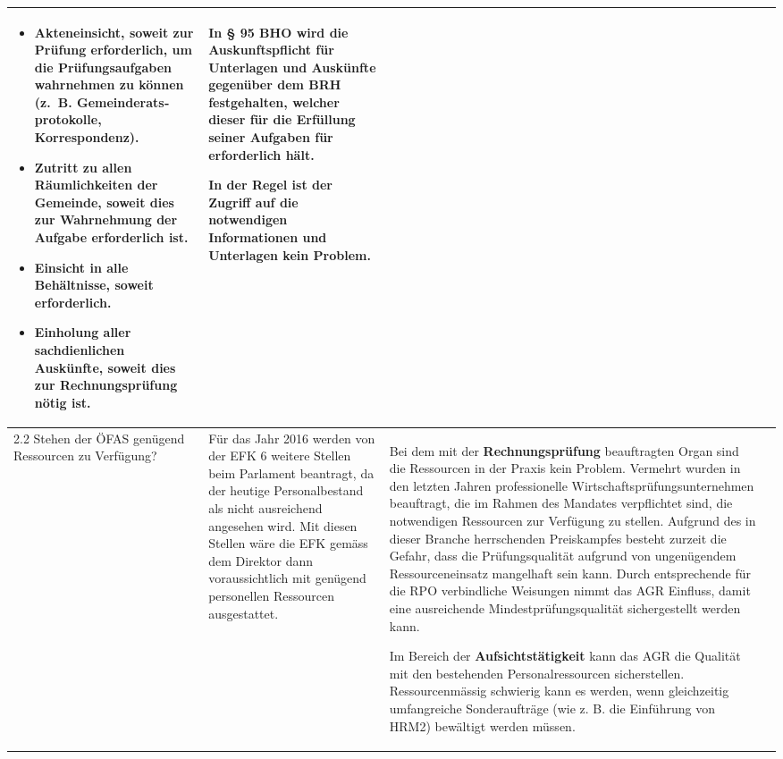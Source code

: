 \documentclass[10pt]{article}
\begin{document}
\begin{landscape}
\begin{center}
\begin{longtable}{|p{4cm}|p{5cm}|p{7.5cm}|p{7.5cm}|}
\begin{itemize}
    \item Akteneinsicht, soweit zur Prüfung erforderlich, um die Prüfungs­auf­gaben wahrnehmen zu können (z.~B. Gemeinderats­proto­kolle, Korrespondenz).

    \item Zutritt zu allen Räumlichkeiten der Gemeinde, soweit dies zur Wahrnehmung der Aufgabe erforderlich ist.

    \item Einsicht in alle Behältnisse, soweit erforderlich.

    \item Einholung aller sachdienlichen Auskünfte, soweit dies zur Rechnungsprüfung nötig ist.

\end{itemize}

 & In § 95 BHO wird die Auskunfts­pflicht für Unterlagen und Aus­künfte gegenüber dem BRH festgehalten, welcher dieser für die Erfüllung seiner Aufgaben für erforderlich hält.

In der Regel ist der Zugriff auf die notwendigen Informationen und Unterlagen kein Problem.

 \\
\hline
2.2 Stehen der ÖFAS genügend Ressourcen zu Verfügung? & Für das Jahr 2016 werden von der EFK 6 weitere Stellen beim Parlament beantragt, da der heutige Personalbestand als nicht ausreichend angesehen wird. Mit diesen Stellen wäre die EFK gemäss dem Direktor dann voraussichtlich mit genügend personellen Ressourcen ausgestattet. & Bei dem mit der \textbf{Rechnungs­prüfung} beauftragten Organ sind die Ressourcen in der Praxis kein Problem. Vermehrt wurden in den letzten Jahren professionelle Wirtschaftsprüfungsunternehmen beauftragt, die im Rahmen des Mandates verpflichtet sind, die notwendigen Ressourcen zur Verfügung zu stellen. Aufgrund des in dieser Branche herr­schenden Preiskampfes besteht zurzeit die Gefahr, dass die Prüfungsqualität aufgrund von ungenügendem Ressourcen­einsatz mangelhaft sein kann. Durch entsprechende für die RPO verbindliche Weisungen nimmt das AGR Einfluss, damit eine aus­reichende Mindestprüfungs­qualität sicherge­stellt werden kann.

Im Bereich der \textbf{Aufsichts­tätigkeit}  kann das AGR die Qualität mit den bestehenden Personal­ressourcen  sicherstellen. Ressourcenmässig schwierig kann es werden, wenn gleichzeitig umfangreiche Sonderaufträge (wie z. B. die Einführung von HRM2) bewältigt werden müssen.


\end{longtable}
\end{center}
\end{landscape}
\end{document}
